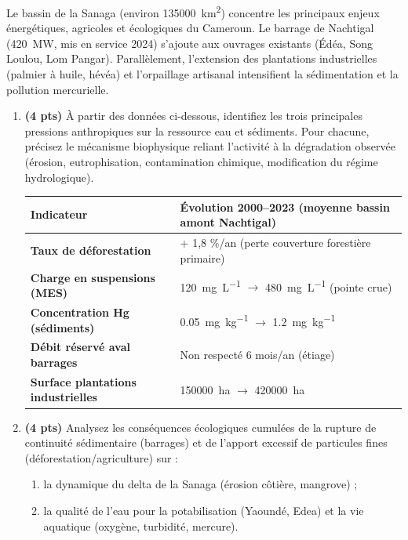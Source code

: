 \documentclass[11pt]{article}
\begin{document}
\begin{exercice}
Le bassin de la Sanaga (environ \SI{135000}{km^2}) concentre les principaux enjeux énergétiques, agricoles et écologiques du Cameroun. Le barrage de Nachtigal (\SI{420}{MW}, mis en service 2024) s'ajoute aux ouvrages existants (Édéa, Song Loulou, Lom Pangar). Parallèlement, l'extension des plantations industrielles (palmier à huile, hévéa) et l'orpaillage artisanal intensifient la sédimentation et la pollution mercurielle.

\begin{enumerate}
    \item \textbf{(4 pts)} À partir des données ci-dessous, identifiez les trois principales pressions anthropiques sur la ressource eau et sédiments. Pour chacune, précisez le mécanisme biophysique reliant l'activité à la dégradation observée (érosion, eutrophisation, contamination chimique, modification du régime hydrologique).
    
    \begin{tabularx}{\linewidth}{>{\bfseries}l X}
    \textbf{Indicateur} & \textbf{Évolution 2000--2023 (moyenne bassin amont Nachtigal)} \\
    \hline
    Taux de déforestation & + 1,8 \%/an (perte couverture forestière primaire) \\
    Charge en suspensions (MES) & \SI{120}{\milli\gram\per\liter} $\to$ \SI{480}{\milli\gram\per\liter} (pointe crue) \\
    Concentration Hg (sédiments) & \SI{0,05}{\milli\gram\per\kilo\gram} $\to$ \SI{1,2}{\milli\gram\per\kilo\gram} \\
    Débit réservé aval barrages & Non respecté 6 mois/an (étiage) \\
    Surface plantations industrielles & \SI{150000}{ha} $\to$ \SI{420000}{ha} \\
    \hline
    \end{tabularx}

    \item \textbf{(4 pts)} Analysez les conséquences écologiques cumulées de la rupture de continuité sédimentaire (barrages) et de l'apport excessif de particules fines (déforestation/agriculture) sur : 
    \begin{enumerate}
        \item la dynamique du delta de la Sanaga (érosion côtière, mangrove) ;
        \item la qualité de l'eau pour la potabilisation (Yaoundé, Edea) et la vie aquatique (oxygène, turbidité, mercure).
    \end{enumerate}


\end{enumerate}
\end{exercice}
\end{document}
